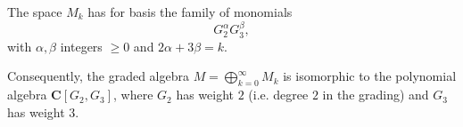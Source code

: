 The space $M_k$ has for basis the family of monomials
$$G_2^\alpha G_3^\beta,$$
with $\alpha, \beta$ integers $\geq 0$ and $2\alpha + 3\beta = k$.

Consequently, the graded algebra $M = \bigoplus_{k=0}^\infty M_k$ is isomorphic to the polynomial algebra $\mathbf{C}[G_2, G_3]$, where $G_2$ has weight $2$ (i.e. degree $2$ in the grading) and $G_3$ has weight $3$.
